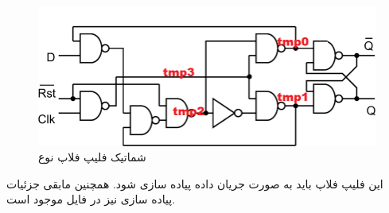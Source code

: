 \documentclass[fleqn]{article}
\begin{document}
\begin{figure}[!htbp]
	\centering
	\includegraphics[width=.5\paperwidth]{dff.png}
	\caption{شماتیک فلیپ فلاپ نوع }
	\label{dff}
\end{figure}

این فلیپ فلاپ باید به صورت جریان داده پیاده سازی شود. همچنین مابقی جزئیات 
پیاده سازی نیز در فایل  موجود است.
\end{document}
